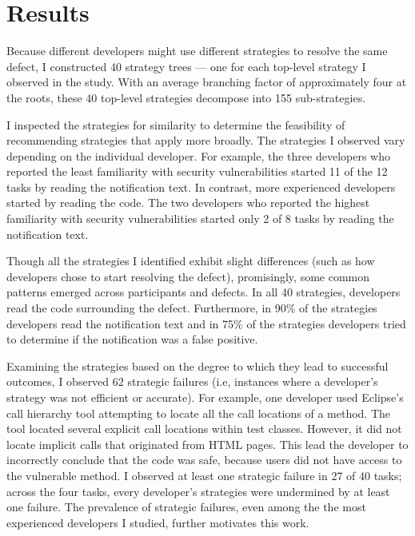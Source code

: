 \documentclass{sig-alternate}
\begin{document}

%



\section{Results}
Because different developers might use different strategies to resolve the same defect, I constructed 40 strategy trees --- one for each top-level strategy I observed in the study. With an average branching factor of approximately four at the roots, these 40 top-level strategies decompose into 155 sub-strategies. 

I inspected the strategies for similarity to determine the feasibility of recommending strategies that apply more broadly.
The strategies I observed vary depending on the individual developer.
For example, the three developers who reported the least familiarity with security vulnerabilities started 11 of the 12 tasks by reading the notification text.
In contrast, more experienced developers started by reading the code.
The two developers who reported the highest familiarity with security vulnerabilities started only 2 of 8 tasks by reading the notification text. 

Though all the strategies I identified exhibit slight differences (such as how developers chose to start resolving the defect), promisingly, some common patterns emerged across participants and defects. 
In all 40 strategies, developers read the code surrounding the defect. Furthermore, in 90\% of the strategies developers read the notification text and in 75\% of the strategies developers tried to determine if the notification was a false positive.



Examining the strategies based on the degree to which they lead to successful outcomes, I observed 62 strategic failures (i.e, instances where a developer's strategy was not efficient or accurate).
For example, one developer used Eclipse's call hierarchy tool attempting to locate all the call locations of a  method. The tool located several explicit call locations within test classes. However, it did not locate implicit calls that originated from HTML pages.
This lead the developer to incorrectly conclude that the code was safe, because users did not have access to the vulnerable method. 
I observed at least one strategic failure in 27 of 40 tasks; across the four tasks, every developer's strategies were undermined by at least one failure.
The prevalence of strategic failures, even among the the most experienced developers I studied, further motivates this work.
\end{document}
